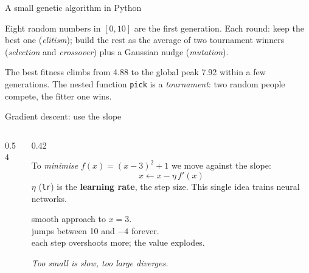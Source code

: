 \documentclass[aspectratio=169,10pt]{beamer}
\begin{document}
\begin{frame}[allowframebreaks]{A small genetic algorithm in Python}
\framebreak
{}
\vspace{2mm}
{\small
Eight random numbers in $[0,10]$ are the first generation. Each round: keep the best one (\emph{elitism}); build the rest as the average of two tournament winners (\emph{selection} and \emph{crossover}) plus a Gaussian nudge (\emph{mutation}).

\vspace{2mm}
The best fitness climbs from 4.88 to the global peak 7.92 within a few generations. The nested function \texttt{pick} is a \emph{tournament}: two random people compete, the fitter one wins.}
\end{frame}

\begin{frame}{Gradient descent: use the slope}
\begin{columns}[T]
\begin{column}{0.54\textwidth}
\vspace{2mm}
\end{column}
\begin{column}{0.42\textwidth}
{\small
To \emph{minimise} $f(x)=(x-3)^2+1$ we move against the slope:
\[x \leftarrow x - \eta\, f'(x)\]
$\eta$ (\texttt{lr}) is the \textbf{learning rate}, the step size. This single idea trains neural networks.

\vspace{2mm}
 smooth approach to $x=3$.\\
 jumps between 10 and $-4$ forever.\\
 each step overshoots more; the value explodes.

\vspace{2mm}
\emph{Too small is slow, too large diverges.}}
\end{column}
\end{columns}
\end{frame}
\end{document}
